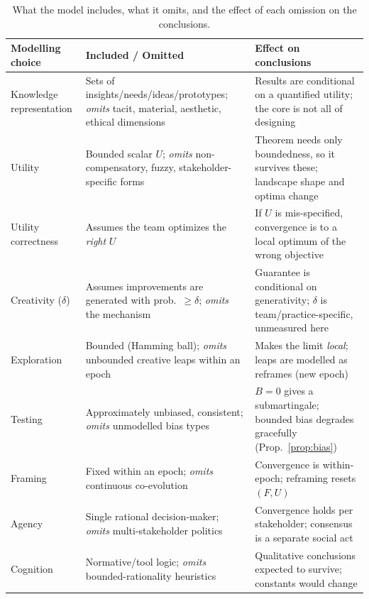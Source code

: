 \documentclass[11pt]{article}
\begin{document}
\begin{table}[h!]
\centering
\caption{What the model includes, what it omits, and the effect of each omission on the conclusions.}
\label{tab:scope}
\footnotesize
\setlength{\tabcolsep}{5pt}
\begin{tabularx}{\textwidth}{@{}>{\raggedright\arraybackslash}p{} >{\raggedright\arraybackslash}X >{\raggedright\arraybackslash}X@{}}
\toprule
\textbf{Modelling choice} & \textbf{Included / Omitted} & \textbf{Effect on conclusions} \\
\midrule
Knowledge representation & Sets of insights/needs/ideas/prototypes; \emph{omits} tacit, material, aesthetic, ethical dimensions & Results are conditional on a quantified utility; the core is not all of designing \\
Utility & Bounded scalar $U$; \emph{omits} non-compensatory, fuzzy, stakeholder-specific forms & Theorem needs only boundedness, so it survives these; landscape shape and optima change \\
Utility correctness & Assumes the team optimizes the \emph{right} $U$ & If $U$ is mis-specified, convergence is to a local optimum of the wrong objective \\
Creativity ($\delta$) & Assumes improvements are generated with prob.\ $\ge\delta$; \emph{omits} the mechanism & Guarantee is conditional on generativity; $\delta$ is team/practice-specific, unmeasured here \\
Exploration & Bounded (Hamming ball); \emph{omits} unbounded creative leaps within an epoch & Makes the limit \emph{local}; leaps are modelled as reframes (new epoch) \\
Testing & Approximately unbiased, consistent; \emph{omits} unmodelled bias types & $B=0$ gives a submartingale; bounded bias degrades gracefully (Prop.~\ref{prop:bias}) \\
Framing & Fixed within an epoch; \emph{omits} continuous co-evolution & Convergence is within-epoch; reframing resets $(F,U)$ \\
Agency & Single rational decision-maker; \emph{omits} multi-stakeholder politics & Convergence holds per stakeholder; consensus is a separate social act \\
Cognition & Normative/tool logic; \emph{omits} bounded-rationality heuristics & Qualitative conclusions expected to survive; constants would change \\
\bottomrule
\end{tabularx}
\end{table}
\end{document}
